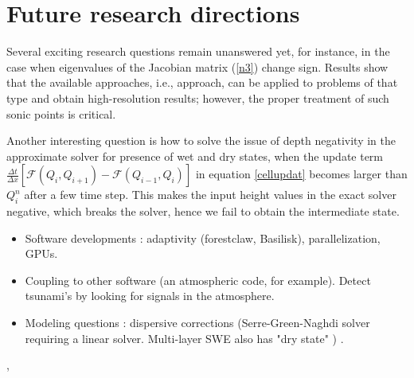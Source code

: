 \documentclass[10pt,a4paper]{article}
\begin{document}
	\section{ Future research directions}
	Several exciting research questions remain unanswered yet, for instance, in the case when eigenvalues of the Jacobian matrix (\eqref{n3}) change sign. Results show that the available approaches, i.e.,  \citet{ba-le-mi-ro:2003} approach, can be applied to problems of that type and obtain high-resolution results; however, the proper treatment of such sonic points is critical. 
	
	Another interesting question is  how to solve the issue of depth negativity in the approximate solver for presence of wet and dry states, when the update term $  \frac{\Delta t}{\Delta x} \left[ \mathcal{F}(Q_{i} , Q_{i+1} ) - \mathcal{F}(Q_{i-1} , Q_{i} ) \right]$ in equation \eqref{cellupdat} becomes larger than $Q_{i}^{n}$  after a few time step. This makes the input height values in the exact solver negative, which breaks the solver, hence we fail to obtain the intermediate state. 

	\begin{itemize}
	\item Software developments : adaptivity (forestclaw, Basilisk), parallelization, GPUs. \cite{qi-le-mo:2018,po:2015,be-ge-le-ma:2011}   
	\item Coupling to other software (an atmospheric code, for example).  Detect tsunami's by looking for signals in the atmosphere.
	\item Modeling questions : dispersive corrections (Serre-Green-Naghdi solver  requiring a linear solver.  Multi-layer SWE also has "dry state" ) \cite{la-bo:2009,po:2020,po:2015}.
	\end{itemize}
	
	
	
	
	
	,
	
	
	
\end{document}
